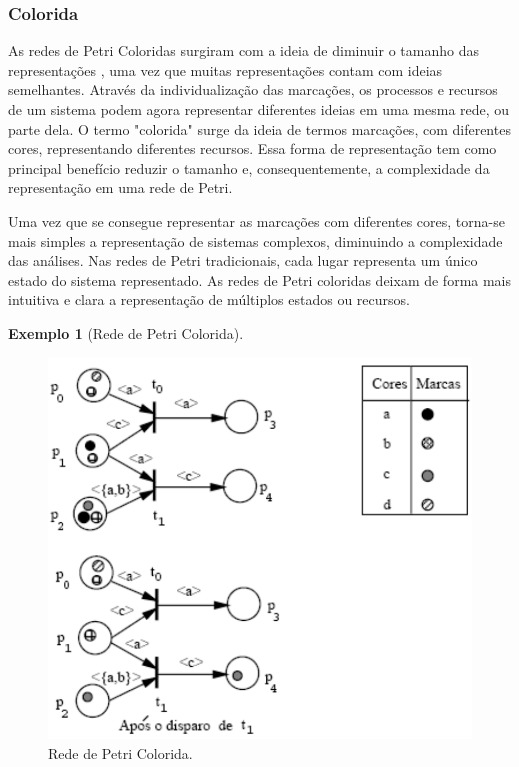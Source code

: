 \documentclass[
	12pt,				%
	openright,			%
	oneside,			%
	a4paper,			%
	english,			%
	brazil				%
	]{abntex2}
\newtheorem{exemplo}{Exemplo}
\begin{document}
\subsubsection*{Colorida} \label{cap:redeColorida}

As redes de Petri Coloridas surgiram com a ideia de diminuir o tamanho das representações \cite{frances2003introduccao}, uma vez que muitas representações contam com ideias semelhantes. Através da individualização das marcações, os processos e recursos de um sistema podem agora representar diferentes ideias em uma mesma rede, ou parte dela. O termo "colorida" surge da ideia de termos marcações, com diferentes cores, representando diferentes recursos. Essa forma de representação tem como principal benefício reduzir o tamanho e, consequentemente, a complexidade da representação em uma rede de Petri.

Uma vez que se consegue representar as marcações com diferentes cores, torna-se mais simples a representação de sistemas complexos, diminuindo a complexidade das análises. Nas redes de Petri tradicionais, cada lugar representa um único estado do sistema representado. As redes de Petri coloridas deixam de forma mais intuitiva e clara a representação de múltiplos estados ou recursos. 

\begin{exemplo} [Rede de Petri Colorida]
\label{exemplo_colorida}
\end{exemplo}

\begin{figure}[ht] 
	\centering
	\includegraphics[scale=0.35]{figuras/rede_petri_colorida.png}
	\caption[Rede de Petri Colorida]{Rede de Petri Colorida. \cite{inbook}}
	\label{fig:rede_petri_colorida}
\end{figure}
\FloatBarrier
\end{document}
